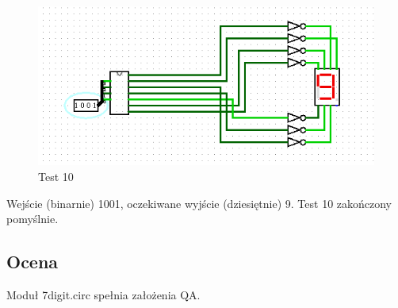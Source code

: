 \begin{figure}[H]
    \includegraphics[width=\linewidth]{logisim_screenshots/9.png}
    \caption{Test 10}
    \label{fig:test9}
\end{figure}

Wejście (binarnie) 1001, oczekiwane wyjście (dziesiętnie) 9.\newline
Test 10 zakończony pomyślnie.

\subsection{Ocena}\label{subsec:qa-review}
Moduł 7digit.circ spełnia założenia QA.